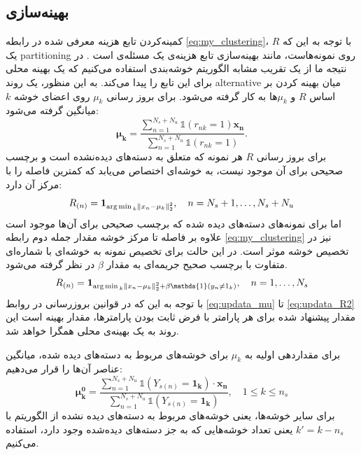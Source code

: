 \subsection{بهینه‌سازی}\label{simple_opt}
 کمینه‌کردن تابع هزینه معرفی شده در رابطه
\eqref{eq:my_clustering}،
با توجه به این که $R$ یک \gls{partitioning} روی نمونه‌هاست، مانند بهینه‌سازی تابع هزینه‌ی  یک مسئله‌ی \nphard است \cite{kmeans_nphard}. در نتیجه ما از یک تقریب
مشابه الگوریتم خوشه‌بندی  استفاده می‌کنیم که یک بهینه محلی برای این تابع را پیدا می‌کند. به این منظور،  یک روند \gls{alternative}  میان بهینه کردن بر اساس $R$ و $\mu_k$ها به کار گرفته می‌شود. برای بروز رسانی $\mu_k$ روی اعضای خوشه $k$ میانگین گرفته می‌شود:
\begin{equation} \label{eq:updata_mu}
 \boldsymbol{\mu_k} = \frac{\sum_{n=1}^{N_s + N_u}  \mathds{1}(r_{nk}=1)\mathbf{x_n}}{\sum_{n=1}^{N_s+N_u}\mathds{1}(r_{nk}=1)}.
\end{equation}
برای بروز رسانی $R$ هر نمونه که متعلق به دسته‌های دیده‌نشده است و برچسب صحیحی برای آن موجود نیست، به خوشه‌ای اختصاص می‌یابد که کمترین فاصله را با مرکز آن دارد:
\begin{equation} \label{eq:updata_R}
R_{(n)} = \mathbf{1}_{\operatorname*{arg\,min\,}_k \left \lVert x_n - \mu_k \right \rVert_2^2}, \quad n=N_s+1,\ldots,N_s+N_u
\end{equation}
اما برای نمونه‌های دسته‌های دیده شده که برچسب صحیحی برای آن‌ها موجود است علاوه بر فاصله تا مرکز خوشه مقدار جمله دوم رابطه \eqref{eq:my_clustering} نیز در تخصیص خوشه موثر است. در این حالت برای تخصیص نمونه به خوشه‌ای با شماره‌ای متفاوت با برچسب صحیح جریمه‌ای به مقدار $\beta$ در نظر گرفته می‌شود.
\begin{align}\label{eq:updata_R2}
R_{(n)} = \mathbf{1}_{\argmin_k \normtwo{x_n - \mu_k} + \beta \mathds{1}(y_n \neq 1_k)}, \quad n=1,\ldots,N_s
\end{align}
با توجه به این که در قوانین بروزرسانی در روابط \eqref{eq:updata_mu} تا \eqref{eq:updata_R2} مقدار پیشنهاد شده برای هر پارامتر با فرض ثابت بودن پارامترها، مقدار بهینه است این روند به یک بهینه‌ی محلی همگرا خواهد شد.

برای مقداردهی اولیه به $\mu_k$ برای  خوشه‌های مربوط به دسته‌های دیده شده، میانگین عناصر آن‌ها را قرار می‌دهیم:
\begin{equation} \label{eq:init_mu}
 \boldsymbol{\mu_k^0} = \frac{\sum_{n=1}^{N_s + N_u}  \mathds{1}(Y_{s(n)} = \mathbf{1_k})\cdot \mathbf{x_n}}{\sum_{n=1}^{N_s+N_u}\mathds{1}(Y_{s(n)} = \mathbf{1_k})},
\quad 1 \leq k \leq n_s
\end{equation}
برای سایر خوشه‌ها، یعنی خوشه‌های مربوط به دسته‌های دیده نشده از الگوریتم
 \cite{kmeanspp}
با $k' = k- n_s$ یعنی تعداد خوشه‌هایی که به جز دسته‌های دیده‌شده وجود دارد،
استفاده می‌کنیم.


